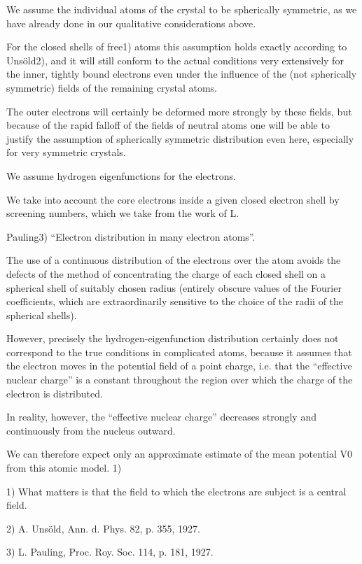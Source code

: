 \documentclass[10pt]{article}
\begin{document}
We assume the individual atoms of the crystal to be spherically symmetric, as we have already done in our qualitative considerations above.\par
For the closed shells of free1) atoms this assumption holds exactly according to Unsöld2), and it will still conform to the actual conditions very extensively for the inner, tightly bound electrons even under the influence of the (not spherically symmetric) fields of the remaining crystal atoms.\par
The outer electrons will certainly be deformed more strongly by these fields, but because of the rapid falloff of the fields of neutral atoms one will be able to justify the assumption of spherically symmetric distribution even here, especially for very symmetric crystals.\par
We assume hydrogen eigenfunctions for the electrons.\par
We take into account the core electrons inside a given closed electron shell by screening numbers, which we take from the work of L.\par
Pauling3) “Electron distribution in many electron atoms”.\par
The use of a continuous distribution of the electrons over the atom avoids the defects of the method of concentrating the charge of each closed shell on a spherical shell of suitably chosen radius (entirely obscure values of the Fourier coefficients, which are extraordinarily sensitive to the choice of the radii of the spherical shells).\par
However, precisely the hydrogen-eigenfunction distribution certainly does not correspond to the true conditions in complicated atoms, because it assumes that the electron moves in the potential field of a point charge, i.e. that the “effective nuclear charge” is a constant throughout the region over which the charge of the electron is distributed.\par
In reality, however, the “effective nuclear charge” decreases strongly and continuously from the nucleus outward.\par
We can therefore expect only an approximate estimate of the mean potential V0 from this atomic model. 1)\par
\noindent\footnotesize 1) What matters is that the field to which the electrons are subject is a central field.\par\normalsize
\noindent\footnotesize 2) A. Unsöld, Ann. d. Phys. 82, p. 355, 1927.\par\normalsize
\noindent\footnotesize 3) L. Pauling, Proc. Roy. Soc. 114, p. 181, 1927.\par\normalsize
\end{document}
